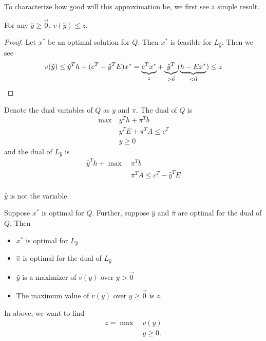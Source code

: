 To characterize how good will this approximation be, we first see a simple result.
\begin{lemma}
	For any \(\hat{y}\geq \vec{0}\), \(v(\hat{y})\leq z\).
\end{lemma}
\begin{proof}
	Let \(x^{*}\) be an optimal solution for \(Q\). Then \(x^{*}\) is feasible for \(L_{\hat{y}}\). Then we see
	\[
		v(\hat{y}) \leq \hat{y}^{T}h + (c^{T} - \hat{y}^{T} E )x^{*} = \underbrace{\vphantom{\hat{y}^{T}}c^{T}x^{*}}_{z} + \underbrace{\hat{y}^{T}}_{\geq \vec{0}}(\underbrace{\vphantom{\hat{y}^{T}}h - Ex^{*}}_{\leq \vec{0}}) \leq z
	\]
\end{proof}

Denote the dual variables of \(Q\) as \(y\) and \(\pi\). The dual of \(Q\) is
\begin{align*}
	\max~ & y^{T}h + \pi^{T} b          \\
	      & y^{T}E + \pi^{T}A\leq c^{T} \\
	      & y\geq 0
\end{align*}
and the dual of \(L_{\hat{y}}\) is
\begin{align*}
	\hat{y}^{T}h + \max~ & \pi^{T}b                          \\
	                     & \pi^{T}A\leq c^{T} - \hat{y}^{T}E \\
\end{align*}
\begin{note}
	\(\hat{y}\) is not the variable.
\end{note}

\begin{theorem}
	\label{lagrangian dual}
	Suppose \(x^{*}\) is optimal for \(Q\). Further, suppose \(\hat{y}\) and \(\hat{\pi}\) are optimal for the dual of \(Q\).
	Then
	\begin{itemize}
		\item \(x^{*}\) is optimal for \(L_{\hat{y}}\)
		\item \(\hat{\pi}\) is optimal for the dual of \(L_{\hat{y}}\)
		\item \(\hat{y}\) is a maximizer of \(v(y)\) over \(y>\vec{0}\)
		\item The maximum value of \(v(y)\) over \(y\geq \vec{0}\) is \(z\).
	\end{itemize}
\end{theorem}
\begin{note}
	In above, we want to find
	\begin{align*}
		z = \max~ & v(y)     \\
		          & y\geq 0.
	\end{align*}
\end{note}

